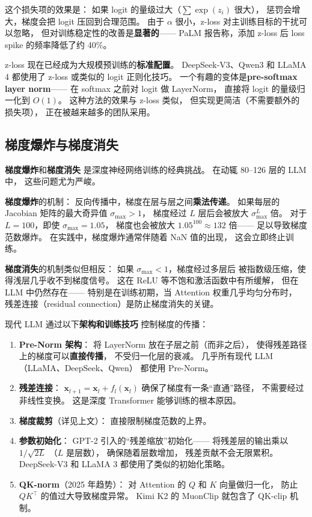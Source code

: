 这个损失项的效果是：
如果 logit 的量级过大（$\sum \exp(z_i)$ 很大），
惩罚会增大，梯度会把 logit 压回到合理范围。
由于 $\alpha$ 很小，z-loss 对主训练目标的干扰可以忽略，
但对训练稳定性的改善是\textbf{显著的}——
PaLM 报告称，添加 z-loss 后
loss spike 的频率降低了约 40\%。

z-loss 现在已经成为大规模预训练的\textbf{标准配置}。
DeepSeek-V3、Qwen3 和 LLaMA 4 都使用了 z-loss
或类似的 logit 正则化技巧。
一个有趣的变体是\textbf{pre-softmax layer norm}——
在 softmax 之前对 logit 做 LayerNorm，
直接将 logit 的量级归一化到 $O(1)$。
这种方法的效果与 z-loss 类似，
但实现更简洁（不需要额外的损失项），
正在被越来越多的团队采用。

\subsection{梯度爆炸与梯度消失}

\textbf{梯度爆炸}和\textbf{梯度消失}
是深度神经网络训练的经典挑战。
在动辄 80--126 层的 LLM 中，
这些问题尤为严峻。

\textbf{梯度爆炸}的机制：
反向传播中，梯度在层与层之间\textbf{乘法传递}。
如果每层的 Jacobian 矩阵的最大奇异值 $\sigma_{\max} > 1$，
梯度经过 $L$ 层后会被放大 $\sigma_{\max}^L$ 倍。
对于 $L = 100$，即使 $\sigma_{\max} = 1.05$，
梯度也会被放大 $1.05^{100} \approx 132$ 倍——
足以导致梯度范数爆炸。
在实践中，梯度爆炸通常伴随着 NaN 值的出现，
这会立即终止训练。

\textbf{梯度消失}的机制类似但相反：
如果 $\sigma_{\max} < 1$，梯度经过多层后
被指数级压缩，使得浅层几乎收不到梯度信号。
这在 ReLU 等不饱和激活函数中有所缓解，
但在 LLM 中仍然存在——
特别是在训练初期，当 Attention 权重几乎均匀分布时，
残差连接（residual connection）是防止梯度消失的关键。

现代 LLM 通过以下\textbf{架构和训练技巧}
控制梯度的传播：

\begin{enumerate}[noitemsep]
  \item \textbf{Pre-Norm 架构}：
        将 LayerNorm 放在子层之前（而非之后），
        使得残差路径上的梯度可以\textbf{直接传播}，
        不受归一化层的衰减。
        几乎所有现代 LLM（LLaMA、DeepSeek、Qwen）
        都使用 Pre-Norm。
  \item \textbf{残差连接}：
        $\mathbf{x}_{l+1} = \mathbf{x}_l + f_l(\mathbf{x}_l)$
        确保了梯度有一条``直通''路径，
        不需要经过非线性变换。
        这是深度 Transformer 能够训练的根本原因。
  \item \textbf{梯度裁剪}（详见上文）：
        直接限制梯度范数的上界。
  \item \textbf{参数初始化}：
        GPT-2 引入的``残差缩放''初始化——
        将残差层的输出乘以 $1/\sqrt{2L}$
        （$L$ 是层数），
        确保随着层数增加，
        残差贡献不会无限累积。
        DeepSeek-V3 和 LLaMA 3 都使用了类似的初始化策略。
  \item \textbf{QK-norm}（2025 年趋势）：
        对 Attention 的 $Q$ 和 $K$ 向量做归一化，
        防止 $QK^\top$ 的值过大导致梯度异常。
        Kimi K2 的 MuonClip 就包含了 QK-clip 机制。
\end{enumerate}

